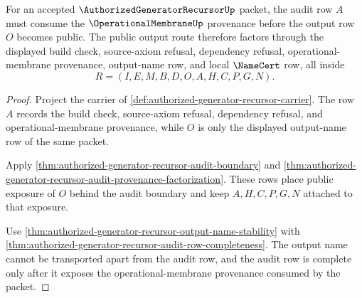 \begin{theorem}
\label{thm:authorized-generator-recursor-operational-membrane-audit-handoff}
For an accepted $\AuthorizedGeneratorRecursorUp$ packet, the audit row $A$ must consume the $\OperationalMembraneUp$ provenance before the output row $O$ becomes public. The public output route therefore factors through the displayed build check, source-axiom refusal, dependency refusal, operational-membrane provenance, output-name row, and local $\NameCert$ row, all inside
$$
R=(I,E,M,B,D,O,A,H,C,P,G,N).
$$
\end{theorem}
\begin{proof}
Project the carrier of \autoref{def:authorized-generator-recursor-carrier}. The row $A$ records the build check, source-axiom refusal, dependency refusal, and operational-membrane provenance, while $O$ is only the displayed output-name row of the same packet.

Apply \autoref{thm:authorized-generator-recursor-audit-boundary} and \autoref{thm:authorized-generator-recursor-audit-provenance-factorization}. These rows place public exposure of $O$ behind the audit boundary and keep $A,H,C,P,G,N$ attached to that exposure.

Use \autoref{thm:authorized-generator-recursor-output-name-stability} with \autoref{thm:authorized-generator-recursor-audit-row-completeness}. The output name cannot be transported apart from the audit row, and the audit row is complete only after it exposes the operational-membrane provenance consumed by the packet.
\end{proof}

